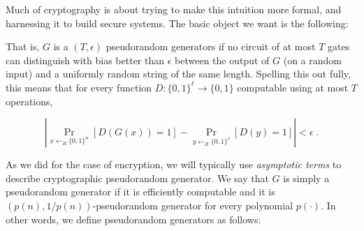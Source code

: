 Much of cryptography is about trying to make this intuition more formal,
and harnessing it to build secure systems. The basic object we want is
the following:

\hypertarget{prgdefconcrete}{}

That is, \(G\) is a \((T,\epsilon)\) pseudorandom generators if no
circuit of at most \(T\) gates can distinguish with bias better than
\(\epsilon\) between the output of \(G\) (on a random input) and a
uniformly random string of the same length. Spelling this out fully,
this means that for every function
\(D:\{0,1\}^\ell \rightarrow \{0,1\}\) computable using at most \(T\)
operations,

\begin{equation*}
\left| \Pr_{x \leftarrow_R \{0,1\}^n}[ D(G(x))=1 ] - \Pr_{y \leftarrow_R \{0,1\}^\ell}[ D(y)=1 ] \right| < \epsilon\;.
\end{equation*}

As we did for the case of encryption, we will typically use
\emph{asymptotic terms} to describe cryptographic pseudorandom
generator. We say that \(G\) is simply a pseudorandom generator if it is
efficiently computable and it is \((p(n),1/p(n))\)-pseudorandom
generator for every polynomial \(p(\cdot)\). In other words, we define
pseudorandom generators as follows:

\hypertarget{prgdef}{}

